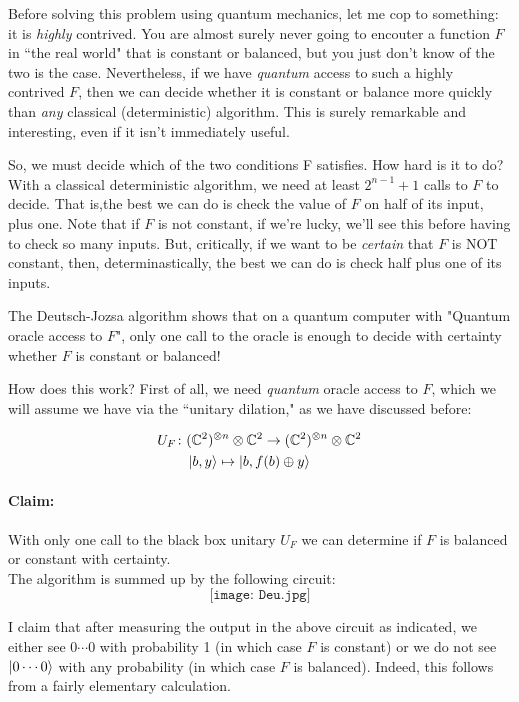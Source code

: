\documentclass{article}
\begin{document}
Before solving this problem using quantum mechanics, let me cop to something: it is \emph{highly} contrived.  You are almost surely never going to encouter a function $F$ in ``the real world" that is constant or balanced, but you just don't know of the two is the case.  Nevertheless, if we have \emph{quantum} access to such a highly contrived $F$, then we can decide whether it is constant or balance more quickly than \emph{any} classical (deterministic) algorithm.  This is surely remarkable and interesting, even if it isn't immediately useful.

So, we must decide which of the two conditions F satisfies. How hard is it to do? With a classical deterministic algorithm, we need at least $2^{n-1} +1$ calls to $F$ to decide.  That is,the best we can do is check the value of $F$ on half of its input, plus one.  Note that if $F$ is not constant, if we're lucky, we'll see this before having to check so many inputs.  But, critically, if we want to be \emph{certain} that $F$ is NOT constant, then, determinastically, the best we can do is check half plus one of its inputs.

The Deutsch-Jozsa algorithm shows that on a quantum computer with "Quantum oracle access to $F$", only one call to the oracle is enough to decide with certainty whether $F$ is constant or balanced!

How does this work?  First of all, we need \emph{quantum} oracle access to $F$, which we will assume we have via the ``unitary dilation," as we have discussed before:

\begin{align*}
U_F\colon & (\mathbb{C}^2)^{\otimes n} \otimes \mathbb{C}^2  \rightarrow (\mathbb{C}^2)^{\otimes n} \otimes \mathbb{C}^2\\
& \ket{b,y}  \mapsto \ket{b,f(b) \oplus y}
\end{align*}

\paragraph{Claim:} With only one call to the black box unitary $U_F$ we can determine if $F$ is balanced or constant with certainty.\\

The algorithm is summed up by the following circuit:
\[
\texttt{[image: Deu.jpg]}
\]

I claim that after measuring the output in the above circuit as indicated, we either see $0\cdots0$ with probability 1 (in which case $F$ is constant) or we do not see $\ket{0\cdots0}$ with any probability (in which case $F$ is balanced).  Indeed, this follows from a fairly elementary calculation.
\end{document}
